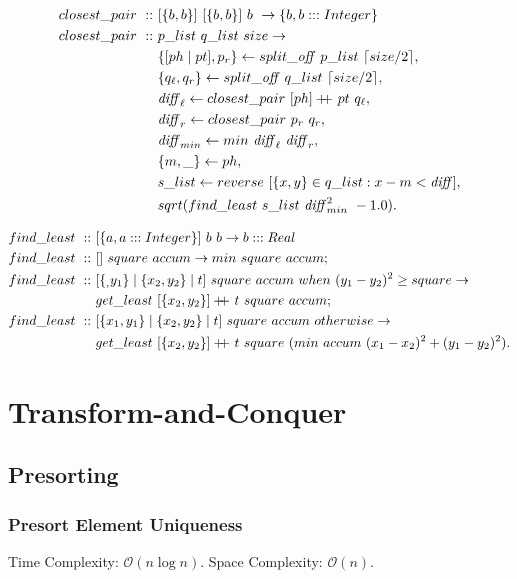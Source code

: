 \documentclass[a4paper,10pt]{book}
\newcommand\doubleplus{+\kern-1.3ex+\kern0.8ex}
\begin{document}
\begin{align*}
closest\_pair\ ::\ &[\{b,b\}]\ [\{b,b\}]\ b\ \rightarrow\{b,b:::Integer\}\\
closest\_pair\ ::\ &p\_list\ q\_list\ size\rightarrow\\
	&\{[ph\mid pt],p_r\}\leftarrow split\_\text{\textit{off}}\ p\_list\ \lceil size/2\rceil,\\
	&\{q_\ell,q_r\}\leftarrow split\_\text{\textit{off}}\ q\_list\ \lceil size/2\rceil,\\
	&\text{\textit{diff}}_\ell\leftarrow closest\_pair\ [ph]\doubleplus pt\ q_\ell,\\
	&\text{\textit{diff}}_r\leftarrow closest\_pair\ p_r\ q_r,\\
	&\text{\textit{diff}}_{min}\leftarrow min\ \text{\textit{diff}}_\ell\ \text{\textit{diff}}_r,\\
	&\{m,\_\}\leftarrow ph,\\
	&s\_list\leftarrow reverse\ [\{x,y\}\in q\_list : x-m<\text{\textit{diff}}],\\
	&sqrt (find\_least\ s\_list\ \text{\textit{diff}}_{min}^2\ -1.0).
\end{align*}

\begin{align*}
find\_least\ ::\ &[\{a,a:::Integer\}]\ b\ b\rightarrow b:::Real\\
find\_least\ ::\ &[]\ square\ accum\rightarrow min\ square\ accum;\\
find\_least\ ::\ &[\{_,y_1\}\mid \{x_2,y_2\}\mid t]\ square\ accum\ when\ (y_1-y_2)^2\ge square\rightarrow\\
	&get\_least\ [\{x_2,y_2\}]\doubleplus t\ square\ accum;\\
find\_least\ ::\ &[\{x_1,y_1\}\mid \{x_2,y_2\}\mid t]\ square\ accum\ otherwise\rightarrow\\
	&get\_least\ [\{x_2,y_2\}]\doubleplus t\ square\ (min\ accum\ (x_1-x_2)^2+(y_1-y_2)^2).
\end{align*}
\chapter{Transform-and-Conquer}
\section{Presorting}
\subsection{Presort Element Uniqueness}Time Complexity: $\mathcal{O}(n\log n)$. Space Complexity: $\mathcal{O}(n)$.
\end{document}
